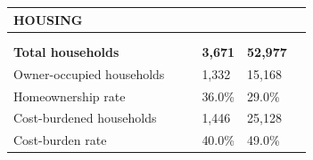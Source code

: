 \documentclass[9pt]{report}
\begin{document}
\vspace{12pt}
\setlength{\tabcolsep}{.01in} %
\begin{tabular}{p{.10in}p{.10in}p{.10in}p{3.7in}>{\hfill}p{.85in}>{\hfill}p{.85in}>{\hfill}p{.85in}>{\hfill}p{.85in}p{0.1in}}
\multicolumn{9}{l}{\parbox{7.1in}{\raggedright{\large{\strut\textbf{HOUSING}\strut}}}} \\ 
\hline
\multicolumn{4}{l}{\parbox{3.5in}{\raggedright{\textbf{}}}} & \multicolumn{1}{r}{\parbox{.85in}{\strut\raggedleft{\textbf{}\strut}}} & \multicolumn{1}{r}{\parbox{.85in}{\strut\raggedleft{\textbf{}\strut}}} & \multicolumn{1}{r}{\parbox{.85in}{\strut{}}} & \multicolumn{1}{r}{\parbox{.85in}{\strut{}}} & \\ 
\multicolumn{9}{l}{} \\ 
\multicolumn{4}{l}{\parbox{3.5in}{\strut\raggedright{\textbf{Total households}\strut}}} & \textbf{} & \textbf{} & \textbf{3,671} & \textbf{52,977} & \textbf{} \\ 
\multicolumn{4}{l}{\parbox{3.6in}{\strut\raggedright{{Owner-occupied households}}\strut}} &  &  & 1,332 & 15,168 & \multicolumn{1}{l}{}  \\ 
\multicolumn{4}{l}{\parbox{3.6in}{\strut\raggedright{{Homeownership rate}}\strut}} &  &  & 36.0\% & 29.0\% & \multicolumn{1}{l}{}  \\ 
\multicolumn{4}{l}{\parbox{3.6in}{\strut\raggedright{{Cost-burdened households}}\strut}} &  &  & 1,446 & 25,128 & \multicolumn{1}{l}{}  \\ 
\multicolumn{4}{l}{\parbox{3.6in}{\strut\raggedright{{Cost-burden rate}}\strut}} &  &  & 40.0\% & 49.0\% & \multicolumn{1}{l}{}  \\ 

\end{tabular}
\setlength{\tabcolsep}{6pt} %
\end{document}

